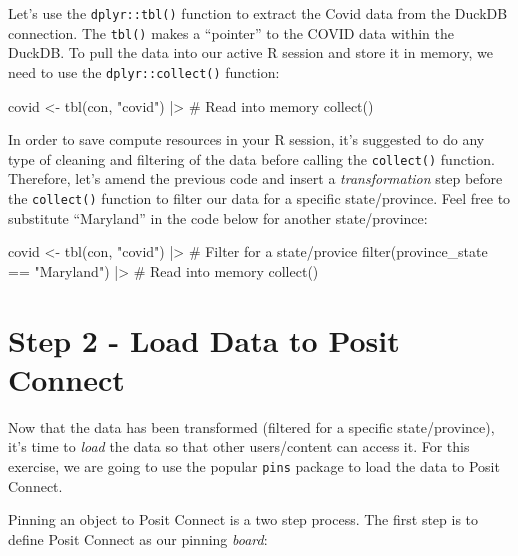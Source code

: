 \documentclass[
  letterpaper,
  DIV=11,
  numbers=noendperiod]{scrreprt}
\newenvironment{Shaded}{\begin{snugshade}}{\end{snugshade}}
\newcommand{\CommentTok}[1]{\textcolor[rgb]{0.37,0.37,0.37}{#1}}
\newcommand{\FunctionTok}[1]{\textcolor[rgb]{0.28,0.35,0.67}{#1}}
\newcommand{\NormalTok}[1]{\textcolor[rgb]{0.00,0.23,0.31}{#1}}
\newcommand{\OtherTok}[1]{\textcolor[rgb]{0.00,0.23,0.31}{#1}}
\newcommand{\SpecialCharTok}[1]{\textcolor[rgb]{0.37,0.37,0.37}{#1}}
\newcommand{\StringTok}[1]{\textcolor[rgb]{0.13,0.47,0.30}{#1}}
\begin{document}
Let's use the \texttt{dplyr::tbl()} function to extract the Covid data
from the DuckDB connection. The \texttt{tbl()} makes a ``pointer'' to
the COVID data within the DuckDB. To pull the data into our active R
session and store it in memory, we need to use the
\texttt{dplyr::collect()} function:

\begin{Shaded}
\begin{Highlighting}[]
\NormalTok{covid }\OtherTok{\textless{}{-}} \FunctionTok{tbl}\NormalTok{(con, }\StringTok{"covid"}\NormalTok{) }\SpecialCharTok{|\textgreater{}} 
  \CommentTok{\# Read into memory}
  \FunctionTok{collect}\NormalTok{()}
\end{Highlighting}
\end{Shaded}

In order to save compute resources in your R session, it's suggested to
do any type of cleaning and filtering of the data before calling the
\texttt{collect()} function. Therefore, let's amend the previous code
and insert a \emph{transformation} step before the \texttt{collect()}
function to filter our data for a specific state/province. Feel free to
substitute ``Maryland'' in the code below for another state/province:

\begin{Shaded}
\begin{Highlighting}[]
\NormalTok{covid }\OtherTok{\textless{}{-}} \FunctionTok{tbl}\NormalTok{(con, }\StringTok{"covid"}\NormalTok{) }\SpecialCharTok{|\textgreater{}}
  \CommentTok{\# Filter for a state/provice}
  \FunctionTok{filter}\NormalTok{(province\_state }\SpecialCharTok{==} \StringTok{"Maryland"}\NormalTok{) }\SpecialCharTok{|\textgreater{}}
  \CommentTok{\# Read into memory}
  \FunctionTok{collect}\NormalTok{()}
\end{Highlighting}
\end{Shaded}

\section{Step 2 - Load Data to Posit
Connect}\label{step-2---load-data-to-posit-connect}

Now that the data has been transformed (filtered for a specific
state/province), it's time to \emph{load} the data so that other
users/content can access it. For this exercise, we are going to use the
popular \texttt{pins} package to load the data to Posit Connect.

Pinning an object to Posit Connect is a two step process. The first step
is to define Posit Connect as our pinning \emph{board}:
\end{document}
